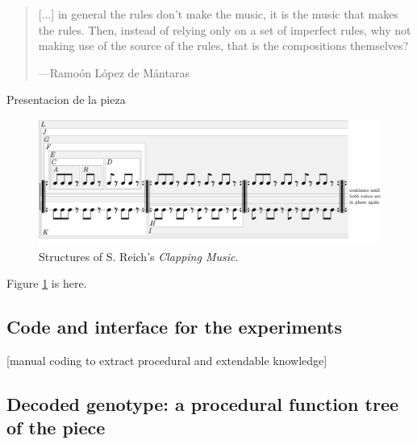 \documentclass{article}
\begin{document}
\begin{samepage}
\begin{quotation}
[...] in general the rules don't make the music, it is the music that makes the rules. Then, instead of relying only on a set of imperfect rules, why not making use of the source of the rules, that is the compositions themselves?

---Ramo\'{o}n L\'{o}pez de M\'{a}ntaras \cite{LopezdeMantaras:2006:MMA:1565082.1565089}
\end{quotation}
\end{samepage}



{\color{red}

Presentacion de la pieza

}


\begin{figure}
  \includegraphics[width=\linewidth]{figs/clapping_patterns.pdf}
  \caption{Structures of S. Reich's \emph{Clapping Music}.}
  \label{fig:boat1}
\end{figure}

{\color{red}

Figure \ref{fig:boat1} is here.

}

\subsection{Code and interface for the experiments}

{\color{red}

[manual coding to extract procedural and extendable knowledge]\cite{Hofmann2015} 

}

\subsection{Decoded genotype: a procedural function tree of the piece}
\end{document}
